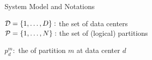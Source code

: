 
\begin{frame}{System Model and Notations}
  \begin{center}
    $\mathcal{D} = \{1, \dots, D\}:$ the set of data centers \\[3pt]

    $\mathcal{P} = \{1, \dots, N\}:$ the set of (logical) partitions


    $p^{m}_{d}:$ the  of partition $m$ at data center $d$
  \end{center}
\end{frame}






